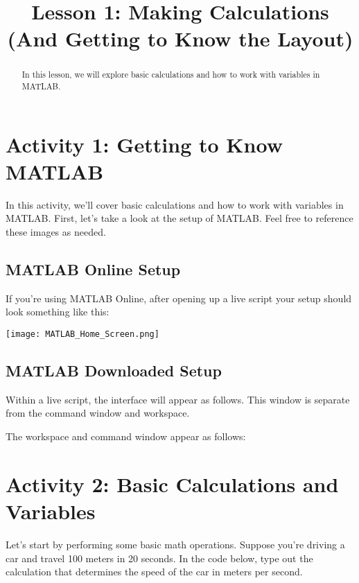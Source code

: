 \documentclass{ximera}
\title{Lesson 1: Making Calculations (And Getting to Know the Layout)}
\begin{document}
\begin{abstract}
In this lesson, we will explore basic calculations and how to work with variables in MATLAB.
\end{abstract}

\section*{Activity 1: Getting to Know MATLAB}

In this activity, we'll cover basic calculations and how to work with variables in MATLAB. 
First, let's take a look at the setup of MATLAB. Feel free to reference these images as needed.

\subsection*{MATLAB Online Setup}

If you're using MATLAB Online, after opening up a live script your setup should look something like this:

\begin{center}
    \texttt{[image: MATLAB\_Home\_Screen.png]}
\end{center}

\subsection*{MATLAB Downloaded Setup}

Within a live script, the interface will appear as follows. This window is separate from the command window and workspace.


The workspace and command window appear as follows:


\section*{Activity 2: Basic Calculations and Variables}

Let's start by performing some basic math operations. Suppose you're driving a car and travel 100 meters in 20 seconds.
In the code below, type out the calculation that determines the speed of the car in meters per second.
\end{document}
